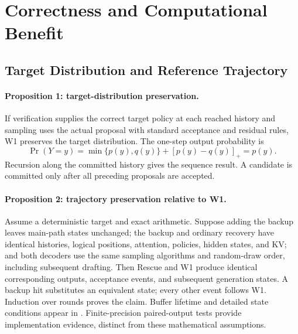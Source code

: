 \section{Correctness and Computational Benefit}
\label{sec:analysis}
\subsection{Target Distribution and Reference Trajectory}
\paragraph{Proposition 1: target-distribution preservation.}
If verification supplies the correct target policy at each reached history and sampling uses the actual proposal with standard acceptance and residual rules, W1 preserves the target distribution. The one-step output probability is
\begin{equation}
\Pr(Y=y)=\min\{p(y),q(y)\}+[p(y)-q(y)]_+=p(y).
\end{equation}
Recursion along the committed history gives the sequence result. A candidate is committed only after all preceding proposals are accepted.

\paragraph{Proposition 2: trajectory preservation relative to W1.}
Assume a deterministic target and exact arithmetic. Suppose adding the backup leaves main-path states unchanged; the backup and ordinary recovery have identical histories, logical positions, attention, policies, hidden states, and KV; and both decoders use the same sampling algorithms and random-draw order, including subsequent drafting. Then Rescue and W1 produce identical corresponding outputs, acceptance events, and subsequent generation states. A backup hit substitutes an equivalent state; every other event follows W1. Induction over rounds proves the claim. Buffer lifetime and detailed state conditions appear in . Finite-precision paired-output tests provide implementation evidence, distinct from these mathematical assumptions.

